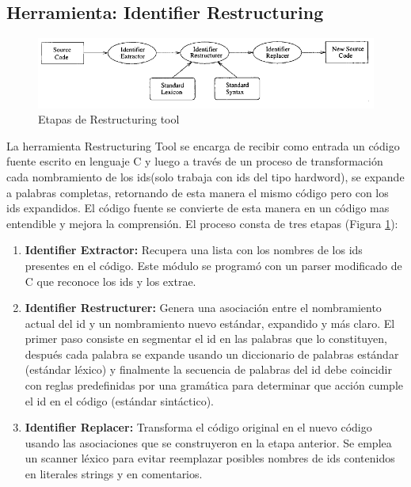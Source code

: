 \documentclass[12pt]{report}
\begin{document}


\pagebreak 
\subsection{Herramienta: Identifier Restructuring}

\begin{figure}[h] %
\centering
\includegraphics[scale= 0.80]{./ire_1.png}
\caption{Etapas de Restructuring tool}
\label{ire1}
\end{figure}

La herramienta Restructuring Tool\cite{BCPT00} se encarga de recibir como entrada un código fuente escrito en lenguaje C y luego a través de un proceso de transformación cada nombramiento de los ids(solo trabaja con ids del tipo hardword), se expande a palabras completas, retornando de esta manera el mismo código pero con los ids expandidos.
El código fuente se convierte de esta manera en un código mas entendible y mejora la comprensión. El proceso consta de tres etapas (Figura \ref{ire1}): 

\begin{enumerate}
\itemsep0em%
\item \textbf{Identifier Extractor:} Recupera una lista con los nombres de los ids presentes en el código. Este módulo se programó con un parser modificado de C que reconoce los ids y los extrae.
\item \textbf{Identifier Restructurer:} Genera una asociación entre el nombramiento actual del id y un nombramiento nuevo estándar, expandido y más claro. El primer paso consiste en segmentar el id en las palabras que lo constituyen, después cada palabra se expande usando un diccionario de palabras estándar (estándar léxico) y finalmente la secuencia de palabras del id debe coincidir con reglas predefinidas por una gramática para determinar que acción cumple el id en el código (estándar sintáctico).
\item \textbf{Identifier Replacer:} Transforma el código original en el nuevo código usando las asociaciones que se construyeron en la etapa anterior. Se emplea un scanner léxico para evitar reemplazar posibles nombres de ids contenidos en literales strings y en comentarios.
\end{enumerate}
\end{document}
